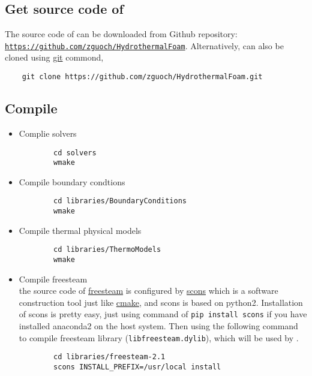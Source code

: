 \subsection{Get source code of \foam}
The source code of \foam can be downloaded from Github repository:
 \href{https://github.com/zguoch/HydrothermalFoam}{\nolinkurl{https://github.com/zguoch/HydrothermalFoam}}.
 Alternatively, \foam can also be cloned using \href{https://git-scm.com}{git} commond,
 \begin{verbatim}
 	git clone https://github.com/zguoch/HydrothermalFoam.git
 \end{verbatim}
\subsection{Compile \foam}
\begin{itemize}
	\item  Complie solvers
	\begin{verbatim}
		cd solvers
		wmake
	\end{verbatim}
	
	\item Compile boundary condtions
	
	\begin{verbatim}
		cd libraries/BoundaryConditions
		wmake
	\end{verbatim}
	
	\item Compile thermal physical models
	\begin{verbatim}
		cd libraries/ThermoModels
		wmake
	\end{verbatim}
	
	\item Compile freesteam \\
	the source code of \href{http://freesteam.sourceforge.net/compile.php}{freesteam} is configured by 
	\href{https://scons.org}{scons} which is a software construction tool just like \href{https://en.wikipedia.org/wiki/CMake}{cmake}, and scons is based on python2.
	Installation of scons is pretty easy, just using command of \texttt{pip install scons} if you have installed anaconda2 on the host system.
	Then using the following command to compile freesteam library (\texttt{libfreesteam.dylib}), which will be used by \foam.
	\begin{verbatim}
		cd libraries/freesteam-2.1
		scons INSTALL_PREFIX=/usr/local install
	\end{verbatim}
\end{itemize}

